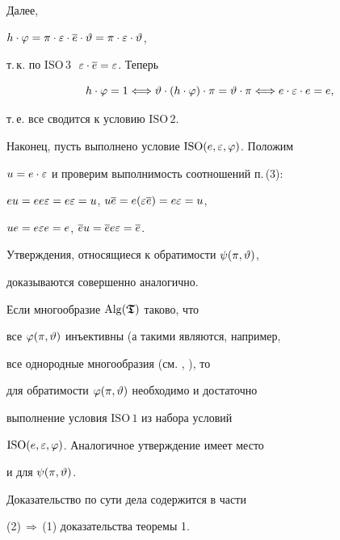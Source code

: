 \begin{pf}
Далее,


$h\cdot\varphi=\pi\cdot\varepsilon\cdot\overline{e}\cdot\vartheta=\pi\cdot\varepsilon\cdot\vartheta$,


т.\,к. по ${\mathrm{ISO\,3}}\;$ $\varepsilon\cdot\overline{e}=\varepsilon$. Теперь


$$


h\cdot\f=1 \Longleftrightarrow


\te\cdot(h\cdot\f)\cdot\pi=\te\cdot\pi


\Longleftrightarrow


e\cdot\ep\cdot e= e,


$$


т.\,е. все сводится к условию ${\mathrm{ISO\,2}}$.





Наконец, пусть выполнено условие ${\mathrm{ISO}}(e,\varepsilon,\varphi)$. Положим


$u=e\cdot\varepsilon$ и проверим выполнимость соотношений п.\,(3):


$eu=ee\varepsilon=e\varepsilon=u$, $u\overline{e}=e(\varepsilon\overline{e})=e\varepsilon=u$,


$ue=e\varepsilon e=e$, $\overline{e} u=\overline{e}e\varepsilon=\overline{e}$.





Утверждения, относящиеся к обратимости $\psi(\pi,\vartheta)$,


доказываются совершенно аналогично.


\end{pf}





\begin{cor} Если многообразие $\operatorname{Alg}({\boldsymbol{\frak T}})$ таково, что


все $\varphi(\pi,\vartheta)$ инъективны (а такими являются, например,


все однородные многообразия (см. \cite{T2}, \cite{T4}), то


для обратимости $\varphi(\pi,\vartheta)$ необходимо и достаточно


выполнение условия ${\mathrm{ISO\,1}}$ из набора условий


${\mathrm{ISO}}(e,\varepsilon,\varphi)$. Аналогичное утверждение имеет место


и для $\psi({\pi,\vartheta})$.


\end{cor}





Доказательство по сути дела содержится в части


(2)\,$\Longrightarrow$\,(1) доказательства теоремы 1.





